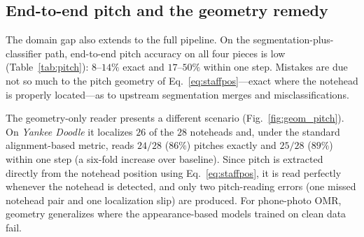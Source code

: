 \subsection{End-to-end pitch and the geometry remedy}
\label{sec:results:pitch}
The domain gap also extends to the full pipeline. On the
segmentation-plus-classifier path, end-to-end pitch accuracy on all four pieces
is low (Table~\ref{tab:pitch}): $8$--$14\%$ exact and $17$--$50\%$ within one
step. Mistakes are due not so much to the pitch geometry of
Eq.~\eqref{eq:staffpos}---exact where the notehead is properly located---as to
upstream segmentation merges and misclassifications.

\begin{table}[t]
  \centering
  \small
  \setlength{\tabcolsep}{5pt}
  \caption{End-to-end pitch accuracy. The seg.+CNN baseline is weak; the geometry
  reader (Sec.~\ref{sec:method:pitch}) lifts \emph{Yankee Doodle} from $14\%$ to
  $86\%$.}
  \label{tab:pitch}
\end{table}

The geometry-only reader presents a different scenario
(Fig.~\ref{fig:geom_pitch}). On \emph{Yankee Doodle} it localizes $26$ of the
$28$ noteheads and, under the standard alignment-based metric, reads $24/28$
($86\%$) pitches exactly and $25/28$ ($89\%$) within one step (a six-fold
increase over baseline). Since pitch is extracted directly from the notehead
position using Eq.~\eqref{eq:staffpos}, it is read perfectly whenever the
notehead is detected, and only two pitch-reading errors (one missed notehead pair
and one localization slip) are produced. For phone-photo OMR, geometry
generalizes where the appearance-based models trained on clean data fail.

